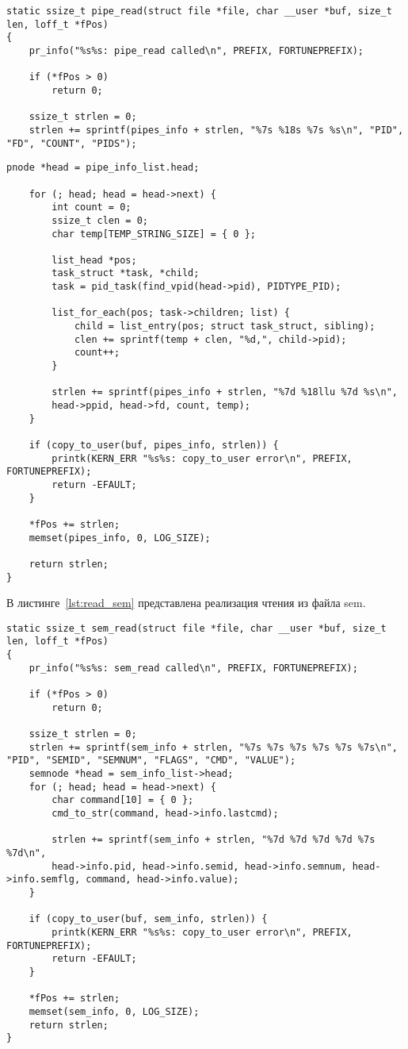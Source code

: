 \begin{lstlisting}[label=lst:read_pipe, caption=Реализация функции чтения из файла pipe]			
static ssize_t pipe_read(struct file *file, char __user *buf, size_t len, loff_t *fPos)
{
	pr_info("%s%s: pipe_read called\n", PREFIX, FORTUNEPREFIX);
	
	if (*fPos > 0)
		return 0;
	
	ssize_t strlen = 0;
	strlen += sprintf(pipes_info + strlen, "%7s %18s %7s %s\n", "PID", "FD", "COUNT", "PIDS");
\end{lstlisting}	
\begin{lstlisting}[label=lst:read_pipe-2, caption=Реализация функции чтения из файла pipe]		
	pnode *head = pipe_info_list.head;
	
	for (; head; head = head->next) {
		int count = 0;
		ssize_t clen = 0;
		char temp[TEMP_STRING_SIZE] = { 0 };
		
		list_head *pos;
		task_struct *task, *child;
		task = pid_task(find_vpid(head->pid), PIDTYPE_PID);
		
		list_for_each(pos; task->children; list) {
			child = list_entry(pos; struct task_struct, sibling);
			clen += sprintf(temp + clen, "%d,", child->pid);
			count++;
		}
		
		strlen += sprintf(pipes_info + strlen, "%7d %18llu %7d %s\n",
		head->ppid, head->fd, count, temp);   
	}
	
	if (copy_to_user(buf, pipes_info, strlen)) {
		printk(KERN_ERR "%s%s: copy_to_user error\n", PREFIX, FORTUNEPREFIX);
		return -EFAULT;
	}
		
	*fPos += strlen;
	memset(pipes_info, 0, LOG_SIZE);
	
	return strlen;
}
\end{lstlisting}

В листинге~\ref{lst:read_sem} представлена реализация чтения из файла sem.

\begin{lstlisting}[label=lst:read_sem, caption=Реализация функции чтения из файла sem]			
static ssize_t sem_read(struct file *file, char __user *buf, size_t len, loff_t *fPos)
{
	pr_info("%s%s: sem_read called\n", PREFIX, FORTUNEPREFIX);
	
	if (*fPos > 0)
		return 0;
	
	ssize_t strlen = 0;
	strlen += sprintf(sem_info + strlen, "%7s %7s %7s %7s %7s %7s\n", "PID", "SEMID", "SEMNUM", "FLAGS", "CMD", "VALUE");
	semnode *head = sem_info_list->head;
	for (; head; head = head->next) {
		char command[10] = { 0 };    
		cmd_to_str(command, head->info.lastcmd);
		
		strlen += sprintf(sem_info + strlen, "%7d %7d %7d %7d %7s %7d\n",
		head->info.pid, head->info.semid, head->info.semnum, head->info.semflg, command, head->info.value);    
	}
	
	if (copy_to_user(buf, sem_info, strlen)) {
		printk(KERN_ERR "%s%s: copy_to_user error\n", PREFIX, FORTUNEPREFIX);
		return -EFAULT;
	}
		
	*fPos += strlen;
	memset(sem_info, 0, LOG_SIZE);
	return strlen;
}
\end{lstlisting}

